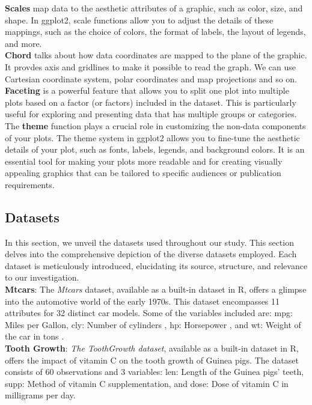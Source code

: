 \documentclass{article}\usepackage[]{graphicx}\usepackage[]{xcolor}
\begin{document}
\noindent
\textbf{Scales} map data to the aesthetic attributes of a graphic, such as color, size, and shape. In ggplot2, scale functions allow you to adjust the details of these mappings, such as the choice of colors, the format of labels, the layout of legends, and more.\\

\noindent
\textbf{Chord} talks about how data coordinates are mapped to the plane of the graphic. It provdes axis and gridlines to make it possible to read the graph. We can use Cartesian coordinate system, polar coordinates and map projections and so on.\\

\noindent
\textbf{Faceting} is a powerful feature that allows you to split one plot into multiple plots based on a factor (or factors) included in the dataset. This is particularly useful for exploring and presenting data that has multiple groups or categories.\\

\noindent
The \textbf{theme} function plays a crucial role in customizing the non-data components of your plots. The theme system in ggplot2 allows you to fine-tune the aesthetic details of your plot, such as fonts, labels, legends, and background colors. It is an essential tool for making your plots more readable and for creating visually appealing graphics that can be tailored to specific audiences or publication requirements.

\subsection{Datasets}
In this section, we unveil the datasets used throughout our study. This section delves into the comprehensive depiction of the diverse datasets employed. Each dataset is meticulously introduced, elucidating its source, structure, and relevance to our investigation.\\

\noindent
\textbf{Mtcars}: The \textit{Mtcars} dataset, available as a built-in dataset in R, offers a glimpse into the automotive world of the early 1970s. This dataset encompasses 11 attributes for 32 distinct car models. Some of the variables included are: mpg: Miles per Gallon, cly: Number of cylinders , hp: Horsepower , and wt: Weight of the car in tons .\\

\noindent
\textbf{Tooth Growth}: \textit{The ToothGrowth dataset}, available as a built-in dataset in R, offers the impact of vitamin C on the tooth growth of Guinea pigs. The dataset consists of 60 observations and 3 variables: len: Length of the Guinea pigs' teeth, supp: Method of vitamin C supplementation, and dose: Dose of vitamin C in milligrams per day.\\
\end{document}
